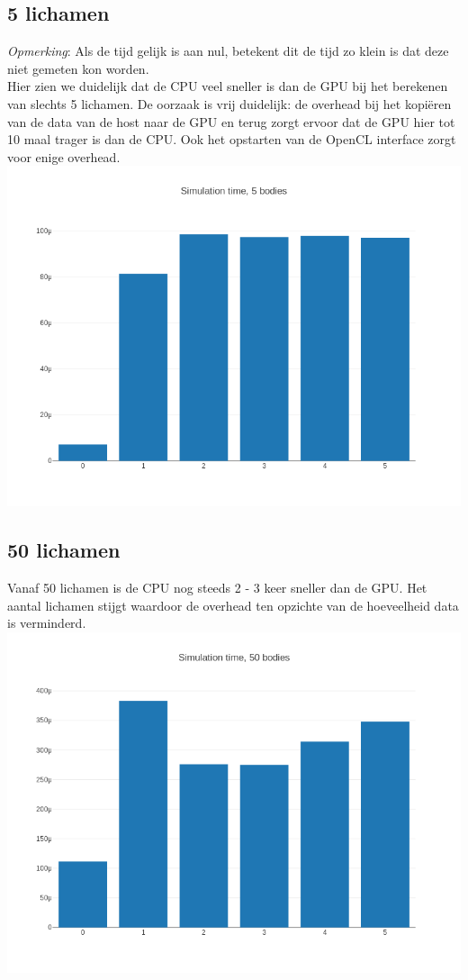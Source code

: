 \documentclass{article}
\begin{document}
\subsection{5 lichamen}
\textit{Opmerking}: Als de tijd gelijk is aan nul, betekent dit de tijd zo klein is dat deze niet gemeten kon worden.
\\
Hier zien we duidelijk dat de CPU veel sneller is dan de GPU bij het berekenen van
slechts 5 lichamen. De oorzaak is vrij duidelijk: de overhead bij het kopi\"{e}ren van
de data van de host naar de GPU en terug zorgt ervoor dat de GPU hier tot 10 maal
trager is dan de CPU. Ook het opstarten van de OpenCL interface zorgt voor enige
overhead.
\includegraphics[width=\textwidth]{grafiekskes/hist_simulation5.png}
\subsection{50 lichamen}
Vanaf 50 lichamen is de CPU nog steeds 2 - 3 keer sneller dan de GPU. Het aantal
lichamen stijgt waardoor de overhead ten opzichte van de hoeveelheid data
is verminderd.
\includegraphics[width=\linewidth]{grafiekskes/hist_simulation50.png}
\end{document}
